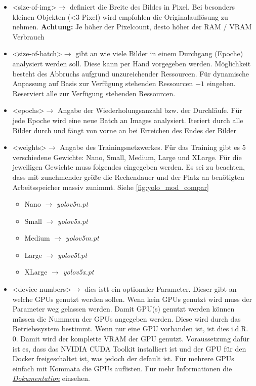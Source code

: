 \begin{itemize}
    \item \textless size-of-img\textgreater $\rightarrow$ definiert die Breite des Bildes in Pixel. Bei besonders kleinen Objekten (<3 Pixel) wird empfohlen die Originalauflösung zu nehmen. \textbf{Achtung:} Je höher der Pixelcount, desto höher der RAM / VRAM Verbrauch 
    \item \textless size-of-batch\textgreater $\rightarrow$  gibt an wie viele Bilder in einem Durchgang (Epoche) analysiert werden soll. Diese kann per Hand vorgegeben werden. Möglichkeit besteht des Abbruchs aufgrund unzureichender Ressourcen. Für dynamische Anpassung auf Basis zur Verfügung stehenden Ressourcen  $-1$ eingeben. Reserviert alle zur Verfügung stehenden Ressourcen.
    \item \textless epochs\textgreater $\rightarrow$  Angabe der Wiederholungsanzahl bzw. der Durchläufe. Für jede Epoche wird eine neue Batch an Images analysiert. Iteriert durch alle Bilder durch und fängt von vorne an bei Erreichen des Endes der Bilder
    \item \textless weights\textgreater $\rightarrow$ Angabe des Trainingsnetzwerkes. Für das Training gibt es 5 verschiedene Gewichte: Nano, Small, Medium, Large und XLarge. Für die jeweiligen Gewichte muss folgendes eingegeben werden. Es sei zu beachten, dass mit zunehmender größe die Rechendauer und der Platz an benötigten Arbeitsspeicher massiv zunimmt. Siehe \autoref{fig:yolo_mod_compar}
    \begin{itemize}
        \item Nano $\rightarrow $ \textit{yolov5n.pt}
        \item Small $\rightarrow $ \textit{yolov5s.pt}
        \item Medium $\rightarrow $ \textit{yolov5m.pt}
        \item Large $\rightarrow $ \textit{yolov5l.pt}
        \item XLarge $\rightarrow $ \textit{yolov5x.pt}
    \end{itemize}
    \item \textless device-numbers\textgreater $\rightarrow$ dies istt ein optionaler Parameter. Dieser gibt an welche GPUs genutzt werden sollen. Wenn kein GPUs genutzt wird muss der Parameter weg gelassen werden. Damit GPU(s) genutzt werden können müssen die Nummern der GPUs angegeben werden. Diese wird durch das Betriebssystem bestimmt. Wenn nur eine GPU vorhanden ist, ist dies i.d.R. 0. Damit wird der komplette VRAM der GPU genutzt. Voraussetzung dafür ist es, dass das NVIDIA CUDA Toolkit installiert ist und der GPU für den Docker freigeschaltet ist, was jedoch der default ist. Für mehrere GPUs einfach mit Kommata die GPUs auflisten. Für mehr Informationen die \textit{\href{https://github.com/ultralytics/yolov5/issues/475}{Dokumentation}} einsehen.
\end{itemize}
